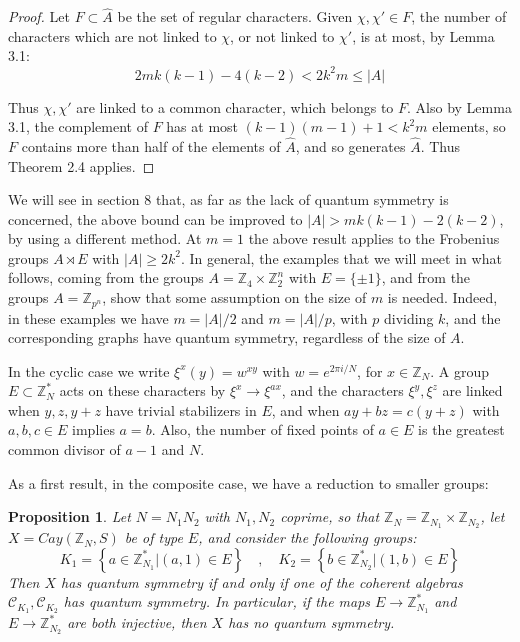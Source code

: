 \documentclass[11pt]{amsart}
\newtheorem{proposition}[theorem]{Proposition}
\newcommand{\C}{\mathcal C}
\newcommand{\Z}{\mathbb Z}
\newcommand{\hA}{\widehat A}
\begin{document}
\begin{proof}
Let $F\subset\hA$ be the set of regular characters. Given $\chi,\chi'\in F$, the number of characters which are not linked to $\chi$, or not linked to $\chi'$, is at most, by Lemma 3.1:
$$2mk(k-1)-4(k-2)<2k^2m\leq|A|$$

Thus $\chi,\chi'$ are linked to a common character, which belongs to $F$. Also by Lemma 3.1, the complement of $F$ has at most $(k-1)(m-1)+1<k^2m$ elements, so $F$ contains more than half of the elements of $\hA$, and so generates $\hA$. Thus Theorem 2.4 applies.
\end{proof}

We will see in section 8 that, as far as the lack of quantum symmetry is concerned, the above bound can be improved to $|A|>mk(k-1)-2(k-2)$, by using a different method. At $m=1$ the above result applies to the Frobenius groups $A\rtimes E$ with $|A|\geq2k^2$. In general, the examples that we will meet in what follows, coming from the groups $A=\Z_4\times\Z_2^n$ with $E=\{\pm1\}$, and from the groups $A=\Z_{p^n}$, show that some assumption on the size of $m$ is needed. Indeed, in these examples we have $m=|A|/2$ and $m=|A|/p$, with $p$ dividing $k$, and the corresponding graphs have quantum symmetry, regardless of the size of $A$.

In the cyclic case we write $\xi^x(y)=w^{xy}$ with $w=e^{2\pi i/N}$, for $x\in\Z_N$. A group $E\subset\Z_N^*$ acts on these characters by $\xi^x\to\xi^{ax}$, and the characters $\xi^y,\xi^z$ are linked when $y,z,y+z$ have trivial stabilizers in $E$, and when $ay+bz=c(y+z)$ with $a,b,c\in E$ implies $a=b$. Also, the number of fixed points of $a\in E$ is the greatest common divisor of $a-1$ and $N$.

As a first result, in the composite case, we have a reduction to smaller groups:

\begin{proposition}
Let $N=N_1N_2$ with $N_1,N_2$ coprime, so that $\Z_N=\Z_{N_1}\times\Z_{N_2}$, let $X=Cay(\Z_N,S)$ be of type $E$, and consider the following groups:
$$K_1=\left\{a\in\Z_{N_1}^*\big|(a,1)\in E\right\}\quad,\quad K_2=\left\{b\in\Z_{N_2}^*\big|(1,b)\in E\right\}$$
Then $X$ has quantum symmetry if and only if one of the coherent algebras $\C_{K_1},\C_{K_2}$ has quantum symmetry. In particular, if the maps $E\to\Z_{N_1}^*$ and $E\to\Z_{N_2}^*$ are both injective, then $X$ has no quantum symmetry.
\end{proposition}
\end{document}
